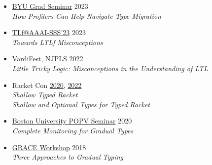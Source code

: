 \documentclass[11pt]{article}
\begin{document}
\begin{itemize}
  \item
    \href{https://cs.byu.edu/events/seminar-series/}{BYU Grad Seminar} \hfill 2023 \\
    \emph{How Profilers Can Help Navigate Type Migration}
  \item
    \href{https://ltlf-symposium.github.io/}{TLf@AAAI-SSS'23} \hfill 2023 \\
    \emph{Towards LTLf Misconceptions}
  \item
    \href{https://vardifest.github.io}{VardiFest}, \href{http://njpls.org/oct22.html}{NJPLS} \hfill 2022\\
    \emph{Little Tricky Logic: Misconceptions in the Understanding of LTL}
  \item
    Racket Con \hfill \href{https://con.racket-lang.org/2020}{2020}, \href{https://con.racket-lang.org/2022}{2022}\\
    \emph{Shallow Typed Racket} \\
    \emph{Shallow and Optional Types for Typed Racket}
  \item
    \href{https://www.bu.edu/cs/research/popv/seminar/}{Boston University POPV Seminar} \hfill {2020}\\
    \emph{Complete Monitoring for Gradual Types}
  \item
    \href{https://2018.splashcon.org/track/grace-2018-papers}{GRACE Workshop} \hfill 2018\\
    \emph{Three Approaches to Gradual Typing}
\end{itemize}
\end{document}
